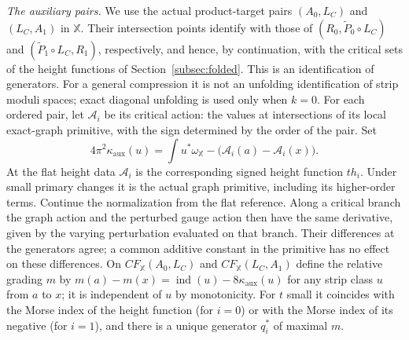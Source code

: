 \documentclass[11pt]{amsart}
\theoremstyle{definition}
\theoremstyle{remark}
\theoremstyle{plain}
\numberwithin{equation}{section}
\newcommand{\ind}{\operatorname{ind}}
\newcommand{\CF}{\mathit{CF}}
\begin{document}
\emph{The auxiliary pairs.} We use the actual product-target pairs
$(A_0,L_C)$ and $(L_C,A_1)$ in $\mathbb X$. Their intersection points identify
with those of $(R_0,\widetilde P_0\circ L_C)$ and
$(\widetilde P_1\circ L_C,R_1)$, respectively, and hence, by continuation, with the critical
sets of the height functions of Section~\ref{subsec:folded}. This is
an identification of generators. For a general compression it is not
an unfolding identification of strip moduli spaces; exact diagonal
unfolding is used only when $k=0$. For each ordered pair,
let $\mathcal A_i$ be its critical action: the values at intersections
of its local exact-graph primitive, with the sign determined by the
order of the pair. Set
\[
4\pi^2\kappa_{\mathrm{aux}}(u)
 =\int u^*\omega_{\mathbb X}-\bigl(\mathcal A_i(a)-\mathcal A_i(x)\bigr).
\]
At the flat height data $\mathcal A_i$ is the corresponding signed
height function $t h_i$. Under small primary changes it is the
actual graph primitive, including its higher-order terms. Continue the
normalization from the flat reference. Along a critical branch the graph
action and the perturbed gauge action then have the same derivative,
given by the varying perturbation evaluated on that branch. Their
differences at the generators agree; a common additive constant in the
primitive has no effect on these differences.
On $\CF_{\mathbb X}(A_0,L_C)$ and $\CF_{\mathbb X}(L_C,A_1)$ define the relative grading $m$ by
$m(a)-m(x)=\ind(u)-8\kappa_{\mathrm{aux}}(u)$ for any strip class $u$ from $a$ to $x$; it is
independent of $u$ by monotonicity. For $t$ small it coincides with the Morse
index of the height function (for $i=0$) or with the Morse index of its
negative (for $i=1$), and there is a unique generator $q_i^*$ of maximal $m$.
\end{document}
